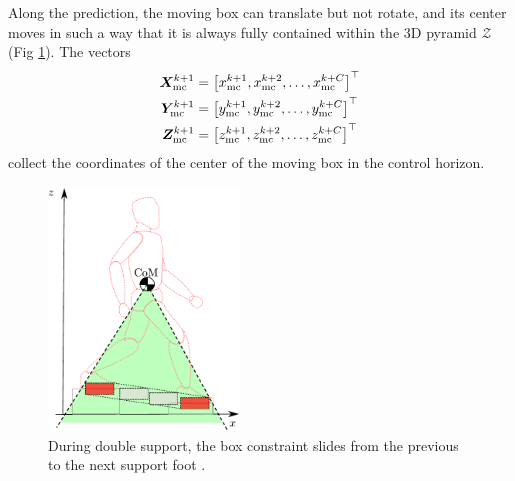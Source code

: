 Along the prediction, the moving box can translate but not rotate, and its
center moves in such a way that it is always
fully contained within the 3D pyramid $\mathcal{Z}$
(Fig \ref{fig:SYROCO18-double-support3D}).
The vectors
\begin{align*}
    \bm{X}_{\rm mc}^{k+1} &= \left[x_{\rm mc}^{k+1}, x_{\rm mc}^{k+2}, \dots, x_{\rm mc}^{k+C}\right]^\top \\
    \bm{Y}_{\rm mc}^{k+1} &= \left[y_{\rm mc}^{k+1}, y_{\rm mc}^{k+2}, \dots, y_{\rm mc}^{k+C}\right]^\top \\
    \bm{Z}_{\rm mc}^{k+1} &= \left[z_{\rm mc}^{k+1}, z_{\rm mc}^{k+2}, \dots, z_{\rm mc}^{k+C}\right]^\top
\end{align*}
collect the coordinates of the center of the moving box in the control horizon.
\begin{figure}
    \centering
    \includegraphics[width=0.45\textwidth]{figures/SYROCO18-double-support3D.pdf}
    \caption{During double support, the box constraint slides from the
        previous to the next support foot \cite{Zamparelli2018SYROCO}.}
    \label{fig:SYROCO18-double-support3D}
\end{figure}

